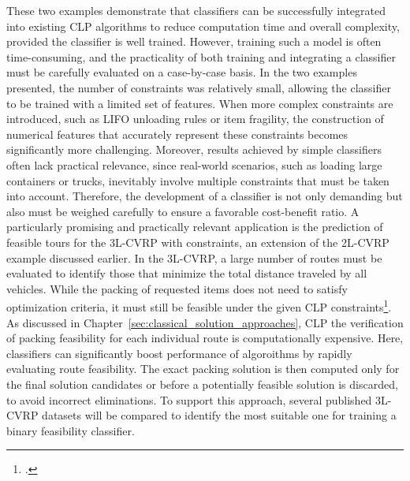 These two examples demonstrate that classifiers can be successfully integrated into existing \gls{CLP}
algorithms to reduce computation time and overall complexity, provided the classifier is well trained.
However, training such a model is often time-consuming, and the practicality of both training and
integrating a classifier must be carefully evaluated on a case-by-case basis.
In the two examples presented, the number of constraints was relatively small, allowing the classifier
to be trained with a limited set of features. When more complex constraints are introduced, such as
\gls{LIFO} unloading rules or item fragility, the construction of numerical features that accurately
represent these constraints becomes significantly more challenging.
Moreover, results achieved by simple classifiers often lack practical relevance, since real-world
scenarios, such as loading large containers or trucks, inevitably involve multiple constraints that
must be taken into account. Therefore, the development of a classifier is not only demanding but also
must be weighed carefully to ensure a favorable cost-benefit ratio.
A particularly promising and practically relevant application is the prediction of feasible tours for the
\gls{3L-CVRP} with constraints, an extension of the \gls{2L-CVRP} example discussed earlier. In the
\gls{3L-CVRP}, a large number of routes must be evaluated to identify those that minimize the total
distance traveled by all vehicles. While the packing of requested items does not need to satisfy
optimization criteria, it must still be feasible under the given \gls{CLP} constraints\footcite[cf.][]{tamke_branch-and-cut_2024}.
As discussed in Chapter~\ref{sec:classical_solution_approaches}, \gls{CLP} the verification of
packing feasibility for each individual route is computationally expensive.
Here, classifiers can significantly boost performance of algoroithms by rapidly evaluating route feasibility. The
exact packing solution is then computed only for the final solution candidates or before a potentially
feasible solution is discarded, to avoid incorrect eliminations.
To support this approach, several published \gls{3L-CVRP} datasets will be compared to identify the most
suitable one for training a binary feasibility classifier.